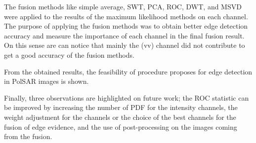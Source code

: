 \documentclass[journal]{IEEEtran}
\begin{document}
The fusion methods like simple average, SWT, PCA, ROC, DWT, and MSVD were applied to the results of the maximum likelihood methods on each channel. The purpose of applying the fusion methods was to obtain better edge detection accuracy and measure the importance of each channel in the final fusion result. On this sense are can notice that mainly the (vv) channel did not contribute to get a good accuracy of the fusion methods.

From the obtained results, the feasibility of procedure proposes for edge detection in PolSAR images is shown.

Finally, three observations are highlighted on future work; the ROC statistic can be improved by increasing the number of PDF for the intensity channels, the weight adjustment for the channels or the choice of the best channels for the fusion of edge evidence, and the use of post-processing on the images coming from the fusion.



\end{document}
